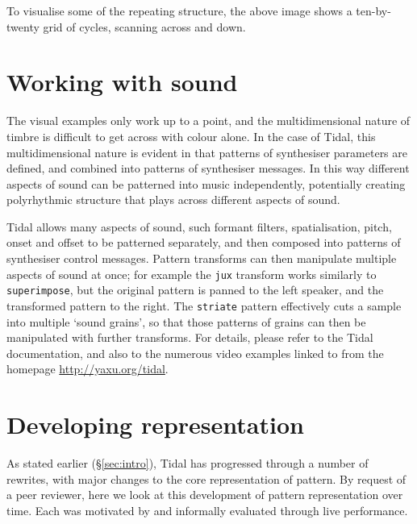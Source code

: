 \documentclass[authoryear,preprint]{sigplanconf}
\begin{document}
To visualise some of the repeating structure, the above image shows a
ten-by-twenty grid of cycles, scanning across and down.

\section{Working with sound}


The visual examples only work up to a point, and the multidimensional
nature of timbre is difficult to get across with colour alone. In the
case of Tidal, this multidimensional nature is evident in that
patterns of synthesiser parameters are defined, and combined into
patterns of synthesiser messages. In this way different aspects of
sound can be patterned into music independently, potentially creating
polyrhythmic structure that plays across different aspects of sound.

Tidal allows many aspects of sound, such formant filters,
spatialisation, pitch, onset and offset to be patterned separately,
and then composed into patterns of synthesiser control
messages. Pattern transforms can then manipulate multiple aspects of
sound at once; for example the \lstinline{jux} transform works
similarly to \lstinline{superimpose}, but the original pattern is
panned to the left speaker, and the transformed pattern to the
right. The \lstinline{striate} pattern effectively cuts a sample into
multiple `sound grains', so that those patterns of grains can then be
manipulated with further transforms. For details, please refer to the
Tidal documentation, and also to the numerous video examples linked to
from the homepage \url{http://yaxu.org/tidal}.


\section{Developing representation}
\label{tidaldev}

As stated earlier (\S \ref{sec:intro}), Tidal has progressed through a
number of rewrites, with major changes to the core representation of
pattern. By request of a peer reviewer, here we look at this
development of pattern representation over time. Each was motivated by
and informally evaluated through live performance.
\end{document}
